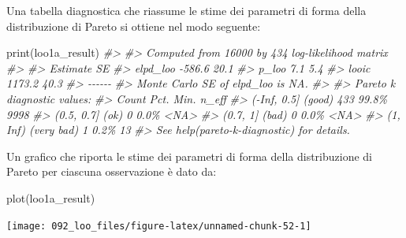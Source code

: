 \documentclass[
  10pt,
  italian,
  a4paper,
  extrafontsizes,onecolumn,openright
  ]{memoir}
\newenvironment{Shaded}{\begin{snugshade}}{\end{snugshade}}
\newcommand{\AttributeTok}[1]{\textcolor[rgb]{0.77,0.63,0.00}{#1}}
\newcommand{\CommentTok}[1]{\textcolor[rgb]{0.56,0.35,0.01}{\textit{#1}}}
\newcommand{\DecValTok}[1]{\textcolor[rgb]{0.00,0.00,0.81}{#1}}
\newcommand{\FunctionTok}[1]{\textcolor[rgb]{0.00,0.00,0.00}{#1}}
\newcommand{\NormalTok}[1]{#1}
\newcommand{\OtherTok}[1]{\textcolor[rgb]{0.56,0.35,0.01}{#1}}
\newcommand{\SpecialCharTok}[1]{\textcolor[rgb]{0.00,0.00,0.00}{#1}}
\theoremstyle{definition}
\theoremstyle{definition}
\theoremstyle{definition}
\theoremstyle{definition}
\theoremstyle{remark}
\begin{document}
\begin{Shaded}
\end{Shaded}

\noindent
Una tabella diagnostica che riassume le stime dei parametri di forma della distribuzione di Pareto si ottiene nel modo seguente:

\begin{Shaded}
\begin{Highlighting}[]
\FunctionTok{print}\NormalTok{(loo1a\_result)}
\CommentTok{\#\textgreater{} }
\CommentTok{\#\textgreater{} Computed from 16000 by 434 log{-}likelihood matrix}
\CommentTok{\#\textgreater{} }
\CommentTok{\#\textgreater{}          Estimate   SE}
\CommentTok{\#\textgreater{} elpd\_loo   {-}586.6 20.1}
\CommentTok{\#\textgreater{} p\_loo         7.1  5.4}
\CommentTok{\#\textgreater{} looic      1173.2 40.3}
\CommentTok{\#\textgreater{} {-}{-}{-}{-}{-}{-}}
\CommentTok{\#\textgreater{} Monte Carlo SE of elpd\_loo is NA.}
\CommentTok{\#\textgreater{} }
\CommentTok{\#\textgreater{} Pareto k diagnostic values:}
\CommentTok{\#\textgreater{}                          Count Pct.    Min. n\_eff}
\CommentTok{\#\textgreater{} ({-}Inf, 0.5]   (good)     433   99.8\%   9998      }
\CommentTok{\#\textgreater{}  (0.5, 0.7]   (ok)         0    0.0\%   \textless{}NA\textgreater{}      }
\CommentTok{\#\textgreater{}    (0.7, 1]   (bad)        0    0.0\%   \textless{}NA\textgreater{}      }
\CommentTok{\#\textgreater{}    (1, Inf)   (very bad)   1    0.2\%   13        }
\CommentTok{\#\textgreater{} See help(\textquotesingle{}pareto{-}k{-}diagnostic\textquotesingle{}) for details.}
\end{Highlighting}
\end{Shaded}

\noindent
Un grafico che riporta le stime dei parametri di forma della distribuzione di Pareto per ciascuna osservazione è dato da:

\begin{Shaded}
\begin{Highlighting}[]
\FunctionTok{plot}\NormalTok{(loo1a\_result)}
\end{Highlighting}
\end{Shaded}

\begin{center}\texttt{[image: 092\_loo\_files/figure-latex/unnamed-chunk-52-1]} \end{center}
\end{document}
